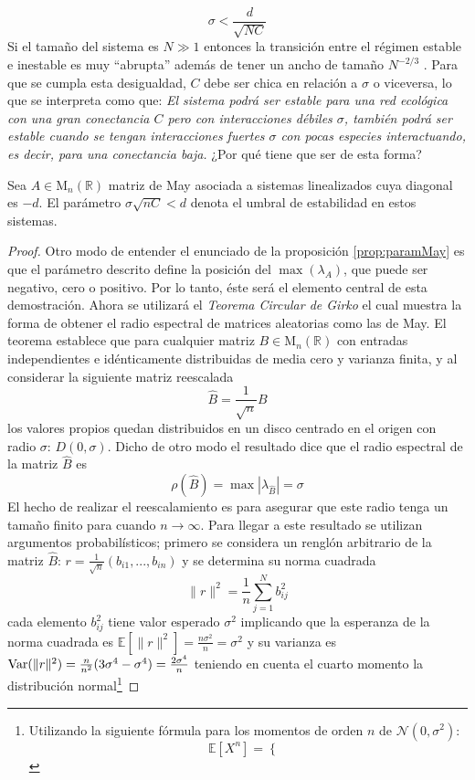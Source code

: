 $$\sigma<\frac{d}{\sqrt{NC}}$$
Si el tamaño del sistema es $N\gg 1$ entonces la transición entre el régimen estable e inestable es muy ``abrupta'' además de tener un ancho de tamaño $N^{-2/3}$ \cite{may1972will}. Para que se cumpla esta desigualdad, $C$ debe ser chica en relación a $\sigma$ o viceversa, lo que se interpreta como que: \textit{El sistema podrá ser estable para una red ecológica con una gran conectancia $C$ pero con interacciones débiles $\sigma$, también podrá ser estable cuando se tengan interacciones fuertes $\sigma$ con pocas especies interactuando, es decir, para una conectancia baja.} ¿Por qué tiene que ser de esta forma?
\begin{proposición}\label{prop:paramMay}
	Sea $A\in\mathrm{M}_n(\mathbb{R})$ matriz de May asociada a sistemas linealizados cuya diagonal es $-d$. El parámetro $\sigma\sqrt{nC}<d$ denota el umbral de estabilidad en estos sistemas.
	\begin{proof}
		Otro modo de entender el enunciado de la proposición \ref{prop:paramMay} es que el parámetro descrito define la posición del $\max(\lambda_A)$, que puede ser negativo, cero o positivo. Por lo tanto, éste será el elemento central de esta demostración. Ahora se utilizará el \textit{Teorema Circular de Girko} \cite{girko1985circular} el cual muestra la forma de obtener el radio espectral de matrices aleatorias como las de May. El teorema establece que para cualquier matriz $B\in \mathrm{M}_n(\mathbb{R})$ con entradas independientes e idénticamente distribuidas de media cero y varianza finita, y al considerar la siguiente matriz reescalada
		$$\hat{B} = \frac{1}{\sqrt{n}}B$$
		los valores propios quedan distribuidos en un disco centrado en el origen con radio $\sigma$: $D(0,\sigma)$. Dicho de otro modo el resultado dice que el radio espectral de la matriz $\hat{B}$ es
		$$\rho(\hat{B})=\max|\lambda_{\hat{B}}|=\sigma$$		
		El hecho de realizar el reescalamiento es para asegurar que este radio tenga un tamaño finito para cuando $n\to\infty$. Para llegar a este resultado se utilizan argumentos probabilísticos; primero se considera un renglón arbitrario de la matriz $\hat{B}$: $r=\frac{1}{\sqrt{n}}(b_{i1},...,b_{in})$ y se determina su norma cuadrada
		$$\|r\|^2=\frac{1}{n}\sum_{j=1}^N b_{ij}^2$$
		cada elemento $b_{ij}^2$ tiene valor esperado $\sigma^2$ implicando que la esperanza de la norma cuadrada es $\mathbb{E}[\|r\|^2]=\frac{n\sigma^2}{n}=\sigma^2$ y su varianza es $\Var(\|r\|^2)=\frac{n}{n^2}(3\sigma^4-\sigma^4)=\frac{2\sigma^4}{n}$ teniendo en cuenta el cuarto momento la distribución normal\footnote{Utilizando la siguiente fórmula para los momentos de orden $n$ de $\mathcal{N}(0,\sigma^2)$: $$\mathbb{E}[X^n]=\begin{cases}

\end{cases}$$}
\end{proof}
\end{proposición}
